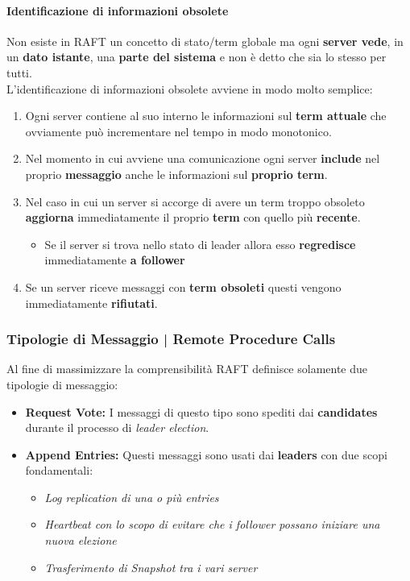     \paragraph{Identificazione di informazioni obsolete}
    Non esiste in RAFT un concetto di stato/term globale ma ogni \textbf{server vede}, in un \textbf{dato istante}, una \textbf{parte del sistema} e non è detto che sia lo stesso per tutti.\\
    L'identificazione di informazioni obsolete avviene in modo molto semplice:
    \begin{enumerate}
      \item Ogni server contiene al suo interno le informazioni sul \textbf{term attuale} che ovviamente può incrementare nel tempo in modo monotonico.
      \item Nel momento in cui avviene una comunicazione ogni server \textbf{include} nel proprio \textbf{messaggio} anche le informazioni sul \textbf{proprio term}.
      \item Nel caso in cui un server si accorge di avere un term troppo obsoleto \textbf{aggiorna} immediatamente il proprio \textbf{term} con quello più \textbf{recente}.
      \begin{itemize}
        \item Se il server si trova nello stato di leader allora esso \textbf{regredisce} immediatamente \textbf{a follower}
      \end{itemize}
      \item Se un server riceve messaggi con \textbf{term obsoleti} questi vengono immediatamente \textbf{rifiutati}.
    \end{enumerate}
  \subsubsection{Tipologie di Messaggio | Remote Procedure Calls}
  Al fine di massimizzare la comprensibilità RAFT definisce solamente due tipologie di messaggio:
  \begin{itemize}
    \item{\textbf{Request Vote:}}
    I messaggi di questo tipo sono spediti dai \textbf{candidates} durante il processo di \textit{leader election}.
    \item{\textbf{Append Entries:}}
    Questi messaggi sono usati dai \textbf{leaders} con due scopi fondamentali:
    \begin{itemize}
      \item{\emph{Log replication di una o più entries}}
      \item{\emph{Heartbeat con lo scopo di evitare che i follower possano iniziare una nuova elezione}}
      \item{\emph{Trasferimento di Snapshot tra i vari server}}
    \end{itemize}
  \end{itemize}

